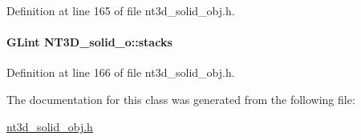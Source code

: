 Definition at line 165 of file nt3d\_\-solid\_\-obj.h.

\paragraph[{stacks}]{\setlength{\rightskip}{0pt plus 5cm}GLint {\bf NT3D\_\-solid\_\-o::stacks}}\hfill\label{class_n_t3_d__solid__o_a97f0bae59eed83b1452a74710ab51179}


Definition at line 166 of file nt3d\_\-solid\_\-obj.h.



The documentation for this class was generated from the following file:\begin{DoxyCompactItemize}
\item 
\hyperlink{nt3d__solid__obj_8h}{nt3d\_\-solid\_\-obj.h}\end{DoxyCompactItemize}
